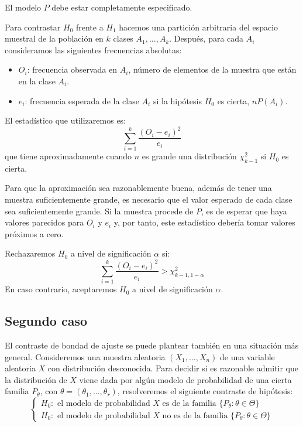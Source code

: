 \begin{note}
    El modelo $P$ debe estar completamente especificado.
\end{note}

Para contrastar $H_0$ frente a $H_1$ hacemos una partición arbitraria del espacio muestral de la población en $k$ clases $A_1, \dots, A_k$.
Después, para cada $A_i$ consideramos las siguientes frecuencias absolutas:
\begin{itemize}
    \item $O_i$: frecuencia observada en $A_i$, número de elementos de la muestra que están en la clase $A_i$.
    \item $e_i$: frecuencia esperada de la clase $A_i$ si la hipótesis $H_0$ es cierta, $nP(A_i)$.
\end{itemize}

El estadístico que utilizaremos es:
$$\sum_{i=1}^k \frac{(O_i-e_i)^2}{e_i}$$
que tiene aproximadamente cuando $n$ es grande una distribución $\chi^2_{k-1}$ si $H_0$ es cierta.

Para que la aproximación sea razonablemente buena, además de tener una muestra suficientemente grande, es necesario que el valor esperado de cada clase sea suficientemente grande.
Si la muestra procede de $P$, es de esperar que haya valores parecidos para $O_i$ y $e_i$ y, por tanto, este estadístico debería tomar valores próximos a cero.

Rechazaremos $H_0$ a nivel de significación $\alpha$ si:
$$\sum_{i=1}^k \frac{(O_i-e_i)^2}{e_i} > \chi^2_{k-1, 1-\alpha}$$
En caso contrario, aceptaremos $H_0$ a nivel de significación $\alpha$.


\subsection*{Segundo caso}
El contraste de bondad de ajuste se puede plantear también en una situación más general.
Consideremos una muestra aleatoria $(X_1, \dots, X_n)$ de una variable aleatoria $X$ con distribución desconocida.
Para decidir si es razonable admitir que la distribución de $X$ viene dada por algún modelo de probabilidad de una cierta familia $P_\theta$, con $\theta = (\theta_1, \dots, \theta_r)$, resolveremos el siguiente contraste de hipótesis:
$$\begin{cases}
        H_0: \text{ el modelo de probabilidad } X \text{ es de la familia } \{P_\theta: \theta \in \Theta\} \\
        H_0: \text{ el modelo de probabilidad } X \text{ no es de la familia } \{P_\theta: \theta \in \Theta\}
    \end{cases}$$

